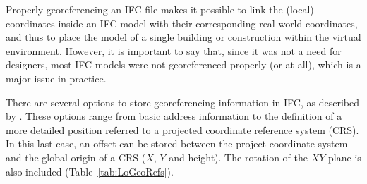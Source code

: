 Properly georeferencing an IFC file makes it possible to link the (local) coordinates inside an IFC model with their corresponding real-world coordinates, and thus to place the model of a single building or construction within the virtual environment.
However, it is important to say that, since it was not a need for designers, most IFC models were not georeferenced properly (or at all), which is a major issue in practice.


There are several options to store georeferencing information in IFC, as described by \citet{clemen2019level}.
These options range from basic address information to the definition of a more detailed position referred to a projected coordinate reference system (CRS).
In this last case, an offset can be stored between the project coordinate system and the global origin of a CRS ($X$, $Y$ and height).
The rotation of the $XY$-plane is also included (Table~\ref{tab:LoGeoRefs}).

